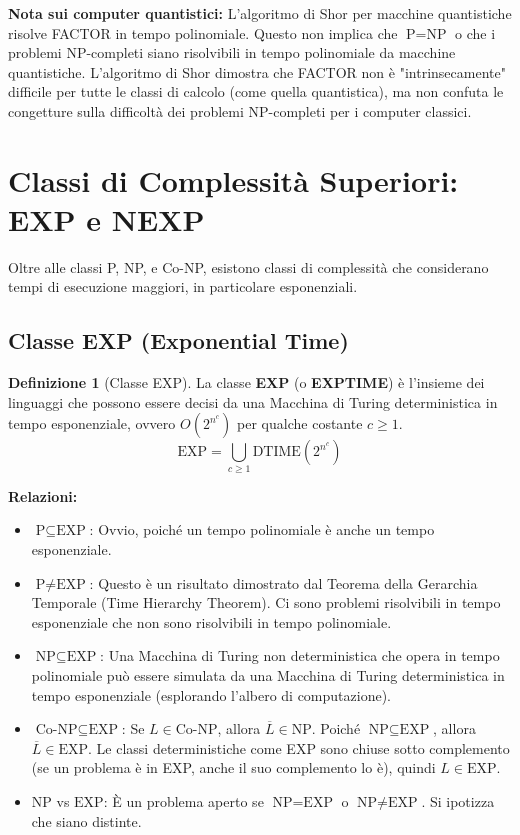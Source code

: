\documentclass[a4paper]{article}
\theoremstyle{definition} %
\newtheorem{definition}{Definizione}
\begin{document}
\textbf{Nota sui computer quantistici:} L'algoritmo di Shor per macchine quantistiche risolve FACTOR in tempo polinomiale. Questo non implica che $\text{P} = \text{NP}$ o che i problemi NP-completi siano risolvibili in tempo polinomiale da macchine quantistiche. L'algoritmo di Shor dimostra che FACTOR non è "intrinsecamente" difficile per tutte le classi di calcolo (come quella quantistica), ma non confuta le congetture sulla difficoltà dei problemi NP-completi per i computer classici.

\section{Classi di Complessità Superiori: EXP e NEXP}

Oltre alle classi P, NP, e Co-NP, esistono classi di complessità che considerano tempi di esecuzione maggiori, in particolare esponenziali.

\subsection{Classe EXP (Exponential Time)}
\begin{definition}[Classe EXP]
La classe \textbf{EXP} (o \textbf{EXPTIME}) è l'insieme dei linguaggi che possono essere decisi da una Macchina di Turing deterministica in tempo esponenziale, ovvero $O(2^{n^c})$ per qualche costante $c \ge 1$.
\[
\text{EXP} = \bigcup_{c \ge 1} \text{DTIME}(2^{n^c})
\]
\end{definition}

\textbf{Relazioni:}
\begin{itemize}
    \item $\text{P} \subseteq \text{EXP}$: Ovvio, poiché un tempo polinomiale è anche un tempo esponenziale.
    \item $\text{P} \neq \text{EXP}$: Questo è un risultato dimostrato dal Teorema della Gerarchia Temporale (Time Hierarchy Theorem). Ci sono problemi risolvibili in tempo esponenziale che non sono risolvibili in tempo polinomiale.
    \item $\text{NP} \subseteq \text{EXP}$: Una Macchina di Turing non deterministica che opera in tempo polinomiale può essere simulata da una Macchina di Turing deterministica in tempo esponenziale (esplorando l'albero di computazione).
    \item $\text{Co-NP} \subseteq \text{EXP}$: Se $L \in \text{Co-NP}$, allora $\overline{L} \in \text{NP}$. Poiché $\text{NP} \subseteq \text{EXP}$, allora $\overline{L} \in \text{EXP}$. Le classi deterministiche come EXP sono chiuse sotto complemento (se un problema è in EXP, anche il suo complemento lo è), quindi $L \in \text{EXP}$.
    \item $\text{NP}$ vs $\text{EXP}$: È un problema aperto se $\text{NP} = \text{EXP}$ o $\text{NP} \neq \text{EXP}$. Si ipotizza che siano distinte.
\end{itemize}
\end{document}
